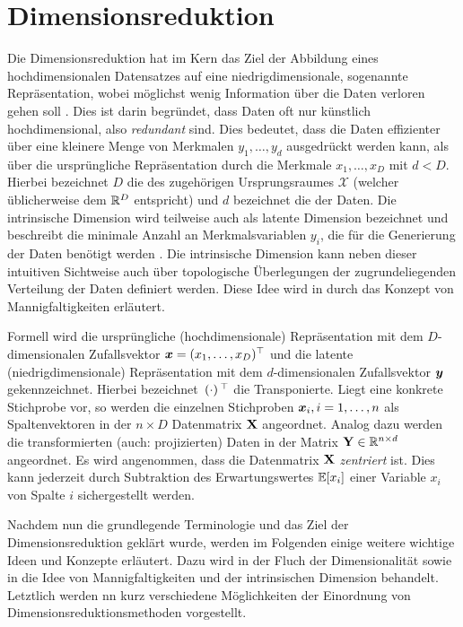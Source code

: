 \chapter{Dimensionsreduktion}
\label{ch:Dimensionsreduktion}

Die Dimensionsreduktion hat im Kern das Ziel der Abbildung eines hochdimensionalen Datensatzes auf
eine niedrigdimensionale, sogenannte  Repräsentation, wobei möglichst wenig
Information über die Daten verloren gehen soll \parencite[2]{Lee.2007}. Dies ist darin begründet, dass Daten oft nur künstlich hochdimensional, also
\textit{redundant} sind. Dies bedeutet, dass die Daten effizienter über eine kleinere Menge von
Merkmalen $y_1,\ldots,y_d$ ausgedrückt werden kann, als über die ursprüngliche Repräsentation durch
die Merkmale $x_1,\ldots,x_D$ mit $d < D$. Hierbei bezeichnet $D$ die  des zugehörigen Ursprungsraumes $\mathcal{X}$ (welcher üblicherweise dem $\mathbb{R}^D$
entspricht) und $d$ bezeichnet die  der Daten. Die intrinsische
Dimension wird teilweise auch als latente Dimension bezeichnet und beschreibt die minimale Anzahl
an Merkmalsvariablen $y_i$, die für die Generierung der Daten benötigt werden \parencite[47]{Lee.2007}. Die intrinsische Dimension kann neben dieser intuitiven Sichtweise auch über
topologische Überlegungen der zugrundeliegenden Verteilung der Daten definiert werden. Diese Idee
wird in  durch das Konzept von
Mannigfaltigkeiten erläutert.

Formell wird die ursprüngliche (hochdimensionale) Repräsentation mit dem $D$-dimensionalen
Zufallsvektor $\bm{x} = (x_1, \ldots, x_D)^\top$ und die latente (niedrigdimensionale)
Repräsentation mit dem $d$-dimensionalen Zufallsvektor $\bm{y}$ gekennzeichnet. Hierbei
bezeichnet $\,(\cdot)\,^\top$ die Transponierte. Liegt eine konkrete Stichprobe vor, so werden die
einzelnen Stichproben $\bm{x}_i, i = 1,\ldots,n$ als Spaltenvektoren in der $n \times D$
Datenmatrix $\mathbf{X}$ angeordnet. Analog dazu werden die transformierten (auch: projizierten) Daten
in der Matrix $\mathbf{Y} \in \mathbb{R}^{n \times d}$ angeordnet. Es wird angenommen, dass die Datenmatrix
$\mathbf{X}$ \textit{zentriert} ist. Dies kann jederzeit durch Subtraktion des Erwartungswertes
$\operatorname{\mathbb{E}}[x_i]$ einer Variable $x_i$ von Spalte $i$ sichergestellt werden.

Nachdem nun die grundlegende Terminologie und das Ziel der Dimensionsreduktion geklärt wurde,
werden im Folgenden einige weitere wichtige Ideen und Konzepte erläutert. Dazu wird in
 der Fluch der Dimensionalität sowie in
 die Idee von Mannigfaltigkeiten und
der intrinsischen Dimension behandelt. Letztlich werden nn 
kurz verschiedene Möglichkeiten der Einordnung von Dimensionsreduktionsmethoden vorgestellt.

